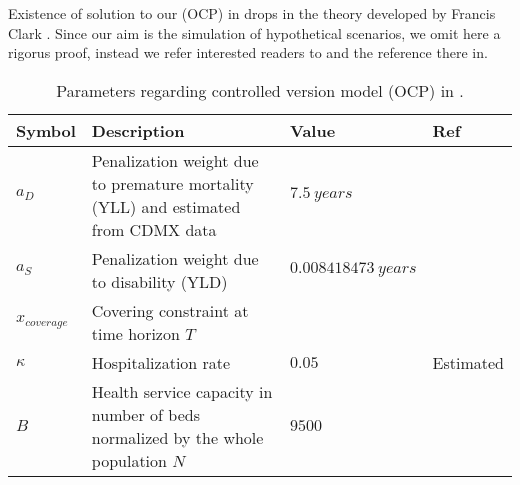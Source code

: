 Existence of solution to our (OCP) in
 drops in the theory
developed by Francis Clark
\cite[see e.g.][Thm. 23.11]{Clarke2013}. Since our aim is the
simulation of
hypothetical scenarios,
we omit here a rigorus proof, instead we refer interested readers to
\cite{Sethi1995,Lenhart2007} and the reference
there in.

\begin{table*}[htb]
    \centering
    \begin{tabular}{%
            >{\centering}
            p{}
            p{}
            p{}
            p{}
        }
        \toprule
        \textbf{Symbol}
        & \textbf{Description}
        & \textbf{Value}
        & \textbf{Ref}
        \\
        \midrule
        $a_D$
        &
        Penalization weight due to  premature mortality (YLL)
        and estimated from CDMX data
        & $\SI{7.5}{years}$ & \cite{WhoDALY,DataMX}
        \\
        $a_S$
        &
        Penalization weight due to disability (YLD)
        & $\SI{0.008418473}{years}$ & \cite{Jo2020}
        \\
        $x_{coverage}$
        &
        Covering constraint at time horizon $T$
        & & \cite{sage2020}

        \\
        $\kappa$
        &
        Hospitalization rate
        &
        $0.05$
        &
        Estimated
        \\
        $B$
        &
        Health service capacity in number of beds
        normalized by the whole
        population $N$
        &
        $9500$
        &

        \\
        \bottomrule
    \end{tabular}
    \caption{
        Parameters regarding
        controlled version model (OCP) in
        .}
    \label{tbl:ocp_parameters_description}
\end{table*}
